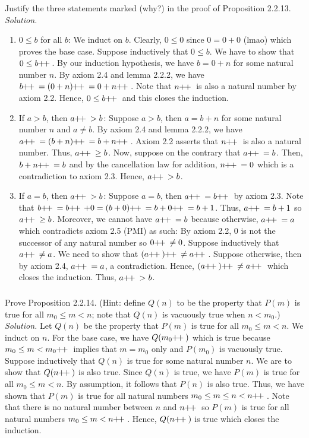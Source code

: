 \documentclass{amsart}
\theoremstyle{definition}
\newcommand{\soln}{\newline\textit{Solution.} }
\newcommand{\pls}{\mathop{\hspace{-2pt}+\hspace{-3.5pt}+{}}}
\begin{document}
\subsubsection{} Justify the three statements marked (why?) in the proof of Proposition 2.2.13. \\
\soln 
\begin{enumerate}
    \item $0\leq b$ for all $b$: We induct on $b$. Clearly, $0\leq 0$ since $0=0+0$ (lmao) which proves the base case. Suppose inductively that $0\leq b$. We have to show that $0\leq b\pls$. By our induction hypothesis, we have $b=0+n$ for some natural number $n$. By axiom 2.4 and lemma 2.2.2, we have $b\pls=(0+n)\pls=0+n\pls$. Note that $n\pls$ is also a natural number by axiom 2.2. Hence, $0\leq b\pls$ and this closes the induction.
    \item If $a>b$, then $a\pls>b$: Suppose $a>b$, then $a=b+n$ for some natural number $n$ and $a\neq b$. By axiom 2.4 and lemma 2.2.2, we have $a\pls=(b+n)\pls=b+n\pls$. Axiom 2.2 asserts that $n\pls$ is also a natural number. Thus, $a\pls\geq b$. Now, suppose on the contrary that $a\pls=b$. Then, $b+n\pls=b$ and by the cancellation law for addition, $n\pls=0$ which is a contradiction to axiom 2.3. Hence, $a\pls>b$.
    \item If $a=b$, then $a\pls>b$: Suppose $a=b$, then $a\pls=b\pls$ by axiom 2.3. Note that $b\pls=b\pls+0=(b+0)\pls=b+0\pls=b+1$. Thus, $a\pls=b+1$ so $a\pls\geq b$. Moreover, we cannot have $a\pls=b$ because otherwise, $a\pls=a$ which contradicts axiom 2.5 (PMI) as such: By axiom 2.2, $0$ is not the successor of any natural number so $0\pls\neq 0$. Suppose inductively that $a\pls\neq a$. We need to show that $(a\pls)\pls\neq a\pls$. Suppose otherwise, then by axiom 2.4, $a\pls=a$, a contradiction. Hence, $(a\pls)\pls\neq a\pls$ which closes the induction. Thus, $a\pls>b$.
\end{enumerate}

\subsubsection{} Prove Proposition 2.2.14. (Hint: define $Q(n)$ to be the property that $P(m)$ is true for all $m_0\leq m<n$; note that $Q(n)$ is vacuously true when $n<m_0$.) \\
\soln Let $Q(n)$ be the property that $P(m)$ is true for all $m_0\leq m<n$. We induct on $n$. For the base case, we have $Q(m_0\pls)$ which is true because $m_0\leq m<m_0\pls$ implies that $m=m_0$ only and $P(m_0)$ is vacuously true. Suppose inductively that $Q(n)$ is true for some natural number $n$. We are to show that $Q(n\pls)$ is also true. Since $Q(n)$ is true, we have $P(m)$ is true for all $m_0\leq m<n$. By assumption, it follows that $P(n)$ is also true. Thus, we have shown that $P(m)$ is true for all natural numbers $m_0\leq m \leq n <n\pls$. Note that there is no natural number between $n$ and $n\pls$ so $P(m)$ is true for all natural numbers $m_0\leq m<n\pls$. Hence, $Q(n\pls)$ is true which closes the induction.\\
\end{document}
